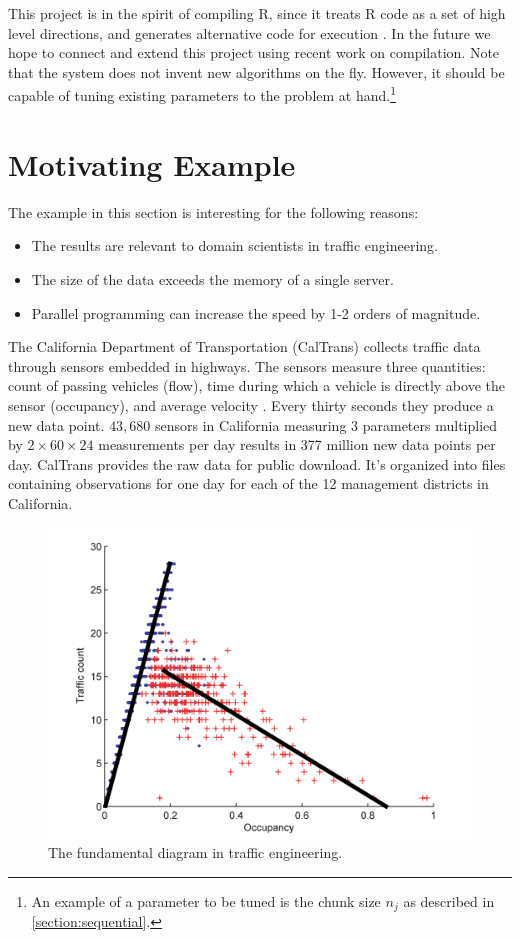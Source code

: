 \documentclass[12pt]{article}
\begin{document}
This project is in the spirit of compiling R, since it treats R code as a
set of high level directions, and generates alternative code for execution
\cite{lang2014enhancing}. In the future we hope to connect and extend this
project using recent work on compilation. Note that the system does not
invent new algorithms on the fly. However, it should be capable of tuning
existing parameters to the problem at hand.\footnote{An example of a
parameter to be tuned is the chunk size $n_j$ as described in
\ref{section:sequential}.} 

\section{Motivating Example}
\label{sec:pems}

The example in this section is interesting for the following reasons:
\begin{itemize}
    \item The results are relevant to domain scientists in traffic engineering.
    \item The size of the data exceeds the memory of a single server.
    \item Parallel programming can increase the speed by 1-2 orders of
        magnitude.
\end{itemize}

The California Department of Transportation (CalTrans) collects traffic data through
sensors embedded in highways. The sensors measure three quantities: count
of passing vehicles (flow), time during which a vehicle is directly above the
sensor (occupancy), and average velocity \cite{jia2001pems}.  Every thirty
seconds they produce a new data point. $43,680$ sensors in California
measuring 3 parameters multiplied by $2 \times 60 \times 24$ measurements
per day results in 377 million new data points per day.  CalTrans provides
the raw data for public download. It's organized into files containing
observations for one day for each of the 12 management districts in
California.

\begin{figure}
\centering
\includegraphics[width=.7\linewidth]{seminar/fundamental_diagram}
\caption{The fundamental diagram in traffic engineering.}
\label{fig:fundamental_diagram}
\end{figure}
\end{document}
